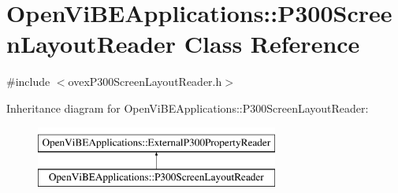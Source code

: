 \hypertarget{classOpenViBEApplications_1_1P300ScreenLayoutReader}{
\section{OpenViBEApplications::P300ScreenLayoutReader Class Reference}
\label{classOpenViBEApplications_1_1P300ScreenLayoutReader}
}


{\ttfamily \#include $<$ovexP300ScreenLayoutReader.h$>$}

Inheritance diagram for OpenViBEApplications::P300ScreenLayoutReader:\begin{figure}[H]
\begin{center}
\leavevmode
\includegraphics[height=2.000000cm]{classOpenViBEApplications_1_1P300ScreenLayoutReader}
\end{center}
\end{figure}
